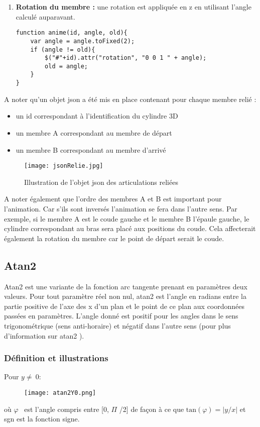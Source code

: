 \begin{enumerate}
\item \textbf{Rotation du membre : } une rotation est appliquée en z en utilisant l'angle calculé auparavant.
\begin{lstlisting}
function anime(id, angle, old){
	var angle = angle.toFixed(2);
	if (angle != old){
		$("#"+id).attr("rotation", "0 0 1 " + angle);
		old = angle;
	}
}
\end{lstlisting}
\end{enumerate}

A noter qu'un \textsf{objet json} a été mis en place contenant pour chaque membre relié : 
\begin{itemize}
\item un id correspondant à l'identification du cylindre 3D 
\item un membre A correspondant au membre de départ
\item un membre B correspondant au membre d'arrivé 
\end{itemize}

\begin{figure}[H]
\centering
\texttt{[image: jsonRelie.jpg]}
\caption{\label{jsonrecu} Illustration de l'objet json des articulations reliées}
\end{figure}

A noter également que l'ordre des membres A et B est important pour l'animation. Car s'ils sont inversés l'animation se fera dans l'autre sens. Par exemple, si le membre A est le coude gauche et le membre B l'épaule gauche, le cylindre correspondant au bras sera placé aux positions du coude. Cela affecterait également la rotation du membre car le point de départ serait le coude.

\subsection*{Atan2} \label{atan2}
Atan2 est une variante de la fonction arc tangente prenant en paramètres deux valeurs. Pour tout paramètre réel non nul, atan2 est l'angle en radians entre la partie positive de l'axe des x d'un plan et le point de ce plan aux coordonnées passées en paramètres. L'angle donné est positif pour les angles dans le sens trigonométrique (sens anti-horaire) et négatif dans l'autre sens (pour plus d'information sur atan2 \cite{atan2}).
\pagebreak
\subsubsection{Définition et illustrations}
Pour $y \ne  \ 0$: \\
\begin{figure}[H]
	\centering
	\texttt{[image: atan2Y0.png]} 
\end{figure}
où $\varphi $ \ est l'angle compris entre [0, $\Pi$ /2] de façon à ce que $\mathrm{tan}(\varphi) = |y/x|$ et sgn est la fonction signe. \\

